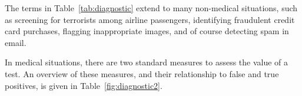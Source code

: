 


The terms in   Table~\ref{tab:diagnostic} extend to many non-medical situations, such as screening for terrorists among airline passengers, identifying fraudulent credit card purchases, flagging inappropriate images, and of course detecting spam in email.


In medical situations, there are two standard measures to assess the value of a test.  An
overview of these measures, and their relationship to false and true
positives, is given in Table~\ref{fig:diagnostic2}.

\begin{table}[htb!]
\caption{Measures of a  diagnostic test.}
\label{fig:diagnostic2}
\end{table}

